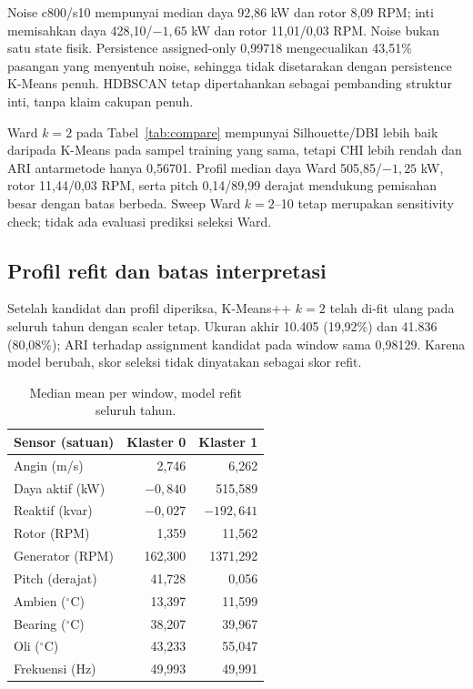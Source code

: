 \documentclass[conference]{IEEEtran}
\begin{document}
Noise c800/s10 mempunyai median daya 92,86 kW dan rotor 8,09 RPM; inti memisahkan daya 428,10/$-1,65$ kW dan rotor 11,01/0,03 RPM. Noise bukan satu state fisik. Persistence assigned-only 0,99718 mengecualikan 43,51\% pasangan yang menyentuh noise, sehingga tidak disetarakan dengan persistence K-Means penuh. HDBSCAN tetap dipertahankan sebagai pembanding struktur inti, tanpa klaim cakupan penuh.

Ward $k=2$ pada Tabel~\ref{tab:compare} mempunyai Silhouette/DBI lebih baik daripada K-Means pada sampel training yang sama, tetapi CHI lebih rendah dan ARI antarmetode hanya 0,56701. Profil median daya Ward 505,85/$-1,25$ kW, rotor 11,44/0,03 RPM, serta pitch 0,14/89,99 derajat mendukung pemisahan besar dengan batas berbeda. Sweep Ward $k=2$--10 tetap merupakan sensitivity check; tidak ada evaluasi prediksi seleksi Ward.

\subsection{Profil refit dan batas interpretasi}
Setelah kandidat dan profil diperiksa, K-Means++ $k=2$ telah di-fit ulang pada seluruh tahun dengan scaler tetap. Ukuran akhir 10.405 (19,92\%) dan 41.836 (80,08\%); ARI terhadap assignment kandidat pada window sama 0,98129. Karena model berubah, skor seleksi tidak dinyatakan sebagai skor refit.

\begin{table}[H]
\centering
\caption{Median mean per window, model refit seluruh tahun.}
\label{tab:profiles}
\footnotesize
\setlength{\tabcolsep}{3pt}
\begin{tabular}{lrr}
\toprule
Sensor (satuan) & Klaster 0 & Klaster 1 \\
\midrule
Angin (m/s) & 2,746 & 6,262 \\
Daya aktif (kW) & $-0,840$ & 515,589 \\
Reaktif (kvar) & $-0,027$ & $-192,641$ \\
Rotor (RPM) & 1,359 & 11,562 \\
Generator (RPM) & 162,300 & 1371,292 \\
Pitch (derajat) & 41,728 & 0,056 \\
Ambien ($^\circ$C) & 13,397 & 11,599 \\
Bearing ($^\circ$C) & 38,207 & 39,967 \\
Oli ($^\circ$C) & 43,233 & 55,047 \\
Frekuensi (Hz) & 49,993 & 49,991 \\
\bottomrule
\end{tabular}
\end{table}
\end{document}
